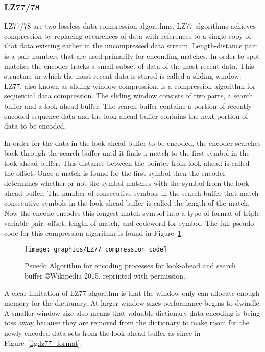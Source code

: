 \documentclass[letterpaper, 12pt]{article}
\begin{document}
\subsubsection{LZ77/78}
LZ77/78 are two lossless data compression algorithms. LZ77 algorithms achieves compression by replacing
occurences of data with references to a single copy of that data existing earlier in the uncompressed
data stream. Length-distance pair is a pair numbers that are used primarily for enconding matches. In order
to spot matches the encoder tracks a small subset of data of the most recent data. This structure in which
the most recent data is stored is called a sliding window. LZ77, also known as sliding window compression, is
a compression algorithm for sequential data compression. The sliding window consists of two parts, a search
buffer and a look-ahead buffer. The search buffer contains a portion of recently encoded sequence data and
the look-ahead buffer contains the next portion of data to be encoded.
\par\vspace{\baselineskip}

In order for the data in the look-ahead buffer to be encoded, the encoder searches back through the
search buffer until it finds a match to the first symbol in the look-ahead buffer. This distance between
the pointer from look-ahead is called the offset. Once a match is found for the first symbol then the encoder
determines whether or not the symbol matches with the symbol from the look-ahead buffer. The number of
consecutive symbols in the search buffer that match consecutive symbols in the look-ahead buffer is called
the length of the match. Now the encode encodes this longest match symbol into a type of format of triple
variable pair: offset, length of match, and codeword for symbol. The full pseudo code for this compression 
algorithm is found in Figure~\ref{fig:lz77_algo}.
\par\vspace{\baselineskip}

\begin{figure}
  \centering
  \texttt{[image: graphics/LZ77\_compression\_code]}
  \caption{Psuedo Algorithm for encoding processes for look-ahead and search buffer \copyright Wikipedia 2015, reprinted with permission.\cite{LZ77_78}}
  \label{fig:lz77_algo}
\end{figure}

\newpage

A clear limitation of LZ77 algorithm is that the window only can allocate enough memory for the dictionary. At
larger window sizes performance begins to dwindle. A smaller window size also means that valuable dictionary data
encoding is being toss away because they are removed from the dictionary to make room for the newly encoded data sets
from the look-ahead buffer as since in Figure~\ref{fig:lz77_format}.
\par\vspace{\baselineskip}
\end{document}
